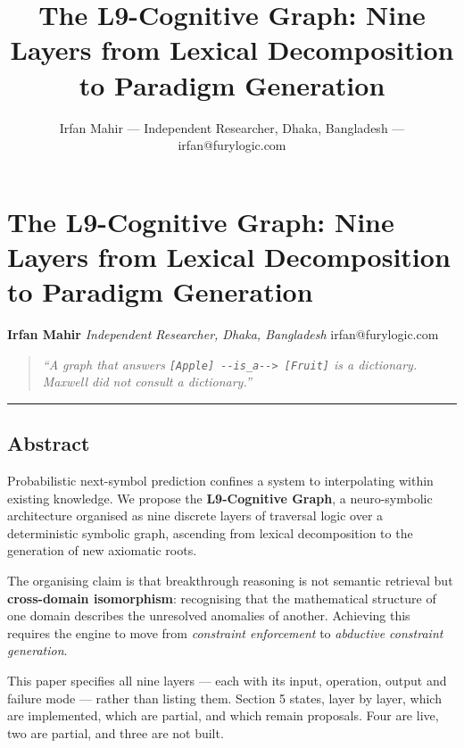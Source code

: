 \documentclass[
  11pt,
  a4paper,
]{article}
\title{The L9-Cognitive Graph: Nine Layers from Lexical Decomposition to
Paradigm Generation}
\author{Irfan Mahir --- Independent Researcher, Dhaka, Bangladesh ---
irfan@furylogic.com}
\date{}
\begin{document}
\maketitle

{
\hypersetup{linkcolor=}
\setcounter{tocdepth}{3}
\tableofcontents
}
\section{The L9-Cognitive Graph: Nine Layers from Lexical Decomposition
to Paradigm
Generation}\label{the-l9-cognitive-graph-nine-layers-from-lexical-decomposition-to-paradigm-generation}

\textbf{Irfan Mahir} \emph{Independent Researcher, Dhaka, Bangladesh}
irfan@furylogic.com

\begin{quote}
\emph{``A graph that answers
\texttt{{[}Apple{]}\ -\/-is\_a-\/-\textgreater{}\ {[}Fruit{]}} is a
dictionary. Maxwell did not consult a dictionary.''}
\end{quote}

\begin{center}\rule{0.5\linewidth}{0.5pt}\end{center}

\subsection{Abstract}\label{abstract}

Probabilistic next-symbol prediction confines a system to interpolating
within existing knowledge. We propose the \textbf{L9-Cognitive Graph}, a
neuro-symbolic architecture organised as nine discrete layers of
traversal logic over a deterministic symbolic graph, ascending from
lexical decomposition to the generation of new axiomatic roots.

The organising claim is that breakthrough reasoning is not semantic
retrieval but \textbf{cross-domain isomorphism}: recognising that the
mathematical structure of one domain describes the unresolved anomalies
of another. Achieving this requires the engine to move from
\emph{constraint enforcement} to \emph{abductive constraint generation}.

This paper specifies all nine layers --- each with its input, operation,
output and failure mode --- rather than listing them. Section 5 states,
layer by layer, which are implemented, which are partial, and which
remain proposals. Four are live, two are partial, and three are not
built.
\end{document}
